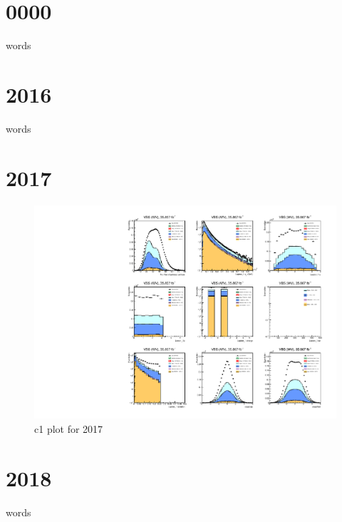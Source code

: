 \documentclass{article}
\begin{document}
	\graphicspath{ {../plots/} }
	\section*{0000}
		words
	\section*{2016}
		words
	\section*{2017}
		\begin{figure}[H]
			\centering
			\includegraphics{2017/c1_2017_test.pdf}
			\caption{c1 plot for 2017}
		\end{figure}
	\section*{2018}
		words
\end{document}
